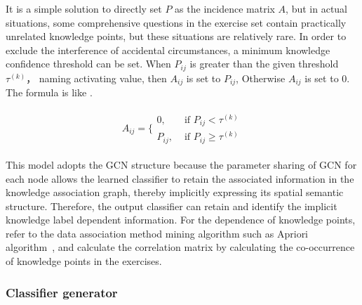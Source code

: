 It is a simple solution to directly set \(P\) as the incidence matrix \(A\), but in actual situations, some comprehensive questions in the exercise set contain practically unrelated knowledge points, but these situations are relatively rare. In order to exclude the interference of accidental circumstances, a minimum knowledge confidence threshold can be set. When \(P_{ij}\) is greater than the given threshold \(\tau^{(k)} \)， naming activating value, then \(A_{ij}\) is set to \(P_{ij}\), Otherwise \(A_{ij}\) is set to 0. The formula is like \eqname{\ref{fml:confidence}}.

\begin{align}
    A_{ij}=\{\begin{array}{ll}
        0,      & \text{ if } P_{ij}<\tau^{(k)}      \\
        P_{ij}, & \text{ if } P_{ij} \geq \tau^{(k)}
    \end{array}\label{fml:confidence}
\end{align}



This model adopts the GCN structure because the parameter sharing of GCN for each node allows the learned classifier to retain the associated information in the knowledge association graph, thereby implicitly expressing its spatial semantic structure. Therefore, the output classifier can retain and identify the implicit knowledge label dependent information. For the dependence of knowledge points, refer to the data association method mining algorithm such as Apriori algorithm~\cite{panjaitan2019implementation}, and calculate the correlation matrix by calculating the co-occurrence of knowledge points in the exercises.


\subsubsection{Classifier generator}


